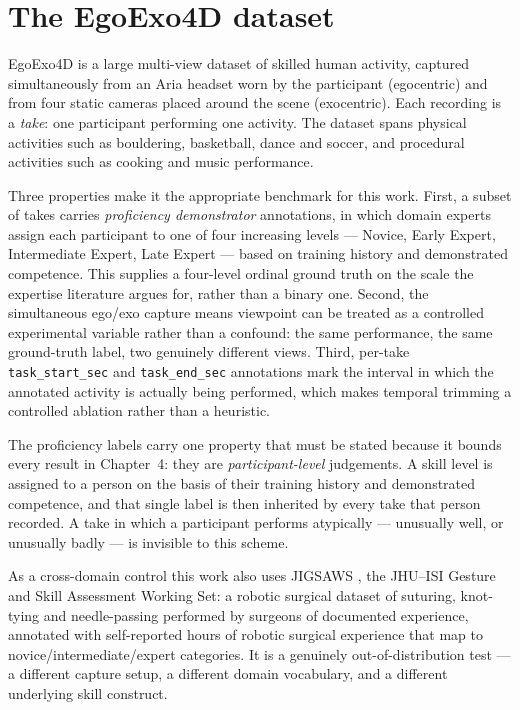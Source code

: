 \documentclass[logo,msc]{infthesis}
\begin{document}
\section{The EgoExo4D dataset}

EgoExo4D \citep{grauman2024} is a large multi-view dataset of skilled human
activity, captured simultaneously from an Aria headset worn by the
participant (egocentric) and from four static cameras placed around the
scene (exocentric). Each recording is a \emph{take}: one participant
performing one activity. The dataset spans physical activities such as
bouldering, basketball, dance and soccer, and procedural activities such as
cooking and music performance.

Three properties make it the appropriate benchmark for this work. First, a
subset of takes carries \emph{proficiency demonstrator} annotations, in
which domain experts assign each participant to one of four increasing
levels --- Novice, Early Expert, Intermediate Expert, Late Expert --- based
on training history and demonstrated competence. This supplies a
four-level ordinal ground truth on the scale the expertise literature
argues for, rather than a binary one. Second, the simultaneous ego/exo
capture means viewpoint can be treated as a controlled experimental
variable rather than a confound: the same performance, the same ground-truth
label, two genuinely different views. Third, per-take
\texttt{task\_start\_sec} and \texttt{task\_end\_sec} annotations mark the
interval in which the annotated activity is actually being performed,
which makes temporal trimming a controlled ablation rather than a heuristic.

The proficiency labels carry one property that must be stated because it
bounds every result in Chapter~4: they are \emph{participant-level}
judgements. A skill level is assigned to a person on the basis of their
training history and demonstrated competence, and that single label is then
inherited by every take that person recorded. A take in which a
participant performs atypically --- unusually well, or unusually badly ---
is invisible to this scheme.

As a cross-domain control this work also uses JIGSAWS
\citep{gao2014}, the JHU--ISI Gesture and Skill Assessment Working Set: a
robotic surgical dataset of suturing, knot-tying and needle-passing
performed by surgeons of documented experience, annotated with
self-reported hours of robotic surgical experience that map to
novice/intermediate/expert categories. It is a genuinely out-of-distribution
test --- a different capture setup, a different domain vocabulary, and a
different underlying skill construct.
\end{document}
